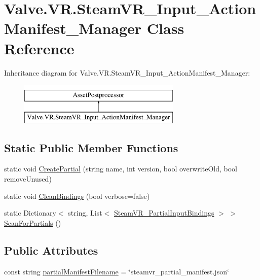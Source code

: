 \hypertarget{class_valve_1_1_v_r_1_1_steam_v_r___input___action_manifest___manager}{}\section{Valve.\+V\+R.\+Steam\+V\+R\+\_\+\+Input\+\_\+\+Action\+Manifest\+\_\+\+Manager Class Reference}
\label{class_valve_1_1_v_r_1_1_steam_v_r___input___action_manifest___manager}
Inheritance diagram for Valve.\+V\+R.\+Steam\+V\+R\+\_\+\+Input\+\_\+\+Action\+Manifest\+\_\+\+Manager\+:\begin{figure}[H]
\begin{center}
\leavevmode
\includegraphics[height=2.000000cm]{class_valve_1_1_v_r_1_1_steam_v_r___input___action_manifest___manager}
\end{center}
\end{figure}
\subsection*{Static Public Member Functions}
\begin{DoxyCompactItemize}
\item 
static void \mbox{\hyperlink{class_valve_1_1_v_r_1_1_steam_v_r___input___action_manifest___manager_a7b709e81ad8ce36517b9aa1e29f58ae0}{Create\+Partial}} (string name, int version, bool overwrite\+Old, bool remove\+Unused)
\item 
static void \mbox{\hyperlink{class_valve_1_1_v_r_1_1_steam_v_r___input___action_manifest___manager_a5ddf34cbcdb0e80b9dd2dfe8c0cbf3f7}{Clean\+Bindings}} (bool verbose=false)
\item 
static Dictionary$<$ string, List$<$ \mbox{\hyperlink{class_valve_1_1_v_r_1_1_steam_v_r___partial_input_bindings}{Steam\+V\+R\+\_\+\+Partial\+Input\+Bindings}} $>$ $>$ \mbox{\hyperlink{class_valve_1_1_v_r_1_1_steam_v_r___input___action_manifest___manager_a7bba008b67bd60cfb82994486c11fab0}{Scan\+For\+Partials}} ()
\end{DoxyCompactItemize}
\subsection*{Public Attributes}
\begin{DoxyCompactItemize}
\item 
const string \mbox{\hyperlink{class_valve_1_1_v_r_1_1_steam_v_r___input___action_manifest___manager_a88936a6c601772bc5f87cac96ae8ea64}{partial\+Manifest\+Filename}} = \char`\"{}steamvr\+\_\+partial\+\_\+manifest.\+json\char`\"{}
\end{DoxyCompactItemize}
